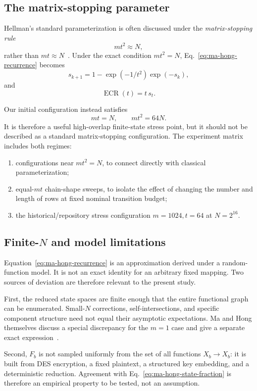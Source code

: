 \subsection{The matrix-stopping parameter}

Hellman's standard parameterization is often discussed under the
\emph{matrix-stopping rule}
\begin{equation}
    mt^2\approx N,
    \label{eq:matrix-stopping}
\end{equation}
rather than $mt\approx N$~\cite{Hellman1980,MaHong2009}.  Under the exact
condition $mt^2=N$, Eq.~\eqref{eq:ma-hong-recurrence} becomes
\[
    s_{k+1}
      =
      1-\exp(-1/t^2)\exp(-s_k),
\]
and
\[
    \operatorname{ECR}(t)=t\,s_t.
\]

Our initial configuration instead satisfies
\[
    mt=N,
    \qquad
    mt^2=64N.
\]
It is therefore a useful high-overlap finite-state stress point, but it should
not be described as a standard matrix-stopping configuration.  The experiment
matrix includes both regimes:
\begin{enumerate}
  \item configurations near $mt^2=N$, to connect directly with classical
        parameterization;
  \item equal-$mt$ chain-shape sweeps, to isolate the effect of changing the
        number and length of rows at fixed nominal transition budget;
  \item the historical/repository stress configuration $m=1024,t=64$ at
        $N=2^{16}$.
\end{enumerate}

\subsection{Finite-$N$ and model limitations}

Equation~\eqref{eq:ma-hong-recurrence} is an approximation derived under a
random-function model.  It is not an exact identity for an arbitrary fixed
mapping.  Two sources of deviation are therefore relevant to the present
study.

First, the reduced state spaces are finite enough that the entire functional
graph can be enumerated.  Small-$N$ corrections, self-intersections, and
specific component structure need not equal their asymptotic expectations.
Ma and Hong themselves discuss a special discrepancy for the $m=1$ case and
give a separate exact expression~\cite{MaHong2009}.

Second, $F_b$ is not sampled uniformly from the set of all functions
$X_b\to X_b$: it is built from DES encryption, a fixed plaintext, a structured
key embedding, and a deterministic reduction.  Agreement with
Eq.~\eqref{eq:ma-hong-state-fraction} is therefore an empirical property to be
tested, not an assumption.

